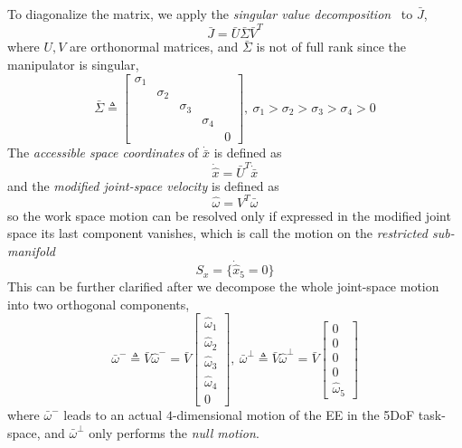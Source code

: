 \documentclass[Afour,sageh,times]{sagej}
\begin{document}
To diagonalize the matrix, we apply the \textit{singular value decomposition}~\cite{} to $\bar{J}$, 
\begin{equation}
\bar{J} = \bar{U}\bar{\Sigma}\bar{V}^T
\end{equation}
where $U, V$ are orthonormal matrices, and $\bar{\Sigma}$ is not of full rank since the manipulator is singular, 
\begin{equation}
\bar{\Sigma} \triangleq \left[
\begin{matrix}
\sigma_1 &&&&\\
& \sigma_2 &&&\\
&& \sigma_3 &&\\
&&& \sigma_4 &\\
&&&& 0
\end{matrix}
\right],\ \sigma_1 > \sigma_2 > \sigma_3 > \sigma_4 > 0
\end{equation}
The \textit{accessible space coordinates} of $\dot{\bar{x}}$ is defined as 
\begin{equation}
\dot{\hat{x}} = \bar{U}^T \dot{\bar{x}}
\end{equation}
and the \textit{modified joint-space velocity} is defined as 
\begin{equation}
\hat{\omega} = V^T\bar{\omega}
\end{equation}
so the work space motion can be resolved only if expressed in the modified joint space its last component vanishes, which is call the motion on the \textit{restricted sub-manifold}
\begin{equation}
S_x = \{\dot{\hat{x}}_5 = 0\}
\end{equation}
This can be further clarified after we decompose the whole joint-space motion into two orthogonal components, 
\begin{equation}
\bar{\omega}^- \triangleq \bar{V}\hat{\omega}^- = \bar{V}\left[
\begin{matrix}
\hat{\omega}_1\\
\hat{\omega}_2\\
\hat{\omega}_3\\
\hat{\omega}_4\\
0
\end{matrix}
\right],\ \bar{\omega}^\perp \triangleq \bar{V}\hat{\omega}^\perp = \bar{V}\left[
\begin{matrix}
0\\
0\\
0\\
0\\
\hat{\omega}_5
\end{matrix}
\right]
\end{equation}
where $\bar{\omega}^-$ leads to an actual $4$-dimensional motion of the EE in the 5DoF task-space, and $\bar{\omega}^\perp$ only performs the \textit{null motion}.
\end{document}
